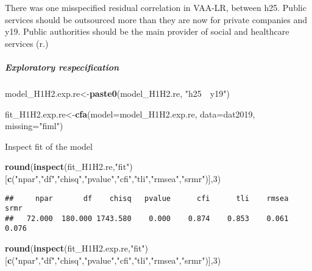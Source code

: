 \documentclass[
]{article}
\newenvironment{Shaded}{\begin{snugshade}}{\end{snugshade}}
\newcommand{\DataTypeTok}[1]{\textcolor[rgb]{0.13,0.29,0.53}{#1}}
\newcommand{\DecValTok}[1]{\textcolor[rgb]{0.00,0.00,0.81}{#1}}
\newcommand{\KeywordTok}[1]{\textcolor[rgb]{0.13,0.29,0.53}{\textbf{#1}}}
\newcommand{\NormalTok}[1]{#1}
\newcommand{\StringTok}[1]{\textcolor[rgb]{0.31,0.60,0.02}{#1}}
\begin{document}
There was one misspecified residual correlation in VAA-LR, between h25.
Public services should be outsourced more than they are now for private
companies and y19. Public authorities should be the main provider of
social and healthcare services (r.)

\hypertarget{exploratory-respecification}{%
\subparagraph{Exploratory
respecification}\label{exploratory-respecification}}

\begin{Shaded}
\begin{Highlighting}[]
\NormalTok{model_H1H2.exp.re<-}\KeywordTok{paste0}\NormalTok{(model_H1H2.re,}
                      \StringTok{"h25~~y19"}\NormalTok{)}
\end{Highlighting}
\end{Shaded}

\begin{Shaded}
\begin{Highlighting}[]
\NormalTok{fit_H1H2.exp.re<-}\KeywordTok{cfa}\NormalTok{(}\DataTypeTok{model=}\NormalTok{model_H1H2.exp.re,}
              \DataTypeTok{data=}\NormalTok{dat2019,}
              \DataTypeTok{missing=}\StringTok{"fiml"}\NormalTok{)}
\end{Highlighting}
\end{Shaded}

Inspect fit of the model

\begin{Shaded}
\begin{Highlighting}[]
\KeywordTok{round}\NormalTok{(}\KeywordTok{inspect}\NormalTok{(fit_H1H2.re,}\StringTok{"fit"}\NormalTok{)}
\NormalTok{      [}\KeywordTok{c}\NormalTok{(}\StringTok{"npar"}\NormalTok{,}\StringTok{"df"}\NormalTok{,}\StringTok{"chisq"}\NormalTok{,}\StringTok{"pvalue"}\NormalTok{,}\StringTok{"cfi"}\NormalTok{,}\StringTok{"tli"}\NormalTok{,}\StringTok{"rmsea"}\NormalTok{,}\StringTok{"srmr"}\NormalTok{)],}\DecValTok{3}\NormalTok{)}
\end{Highlighting}
\end{Shaded}

\begin{verbatim}
##     npar       df    chisq   pvalue      cfi      tli    rmsea     srmr 
##   72.000  180.000 1743.580    0.000    0.874    0.853    0.061    0.076
\end{verbatim}

\begin{Shaded}
\begin{Highlighting}[]
\KeywordTok{round}\NormalTok{(}\KeywordTok{inspect}\NormalTok{(fit_H1H2.exp.re,}\StringTok{"fit"}\NormalTok{)}
\NormalTok{      [}\KeywordTok{c}\NormalTok{(}\StringTok{"npar"}\NormalTok{,}\StringTok{"df"}\NormalTok{,}\StringTok{"chisq"}\NormalTok{,}\StringTok{"pvalue"}\NormalTok{,}\StringTok{"cfi"}\NormalTok{,}\StringTok{"tli"}\NormalTok{,}\StringTok{"rmsea"}\NormalTok{,}\StringTok{"srmr"}\NormalTok{)],}\DecValTok{3}\NormalTok{)}
\end{Highlighting}
\end{Shaded}
\end{document}
